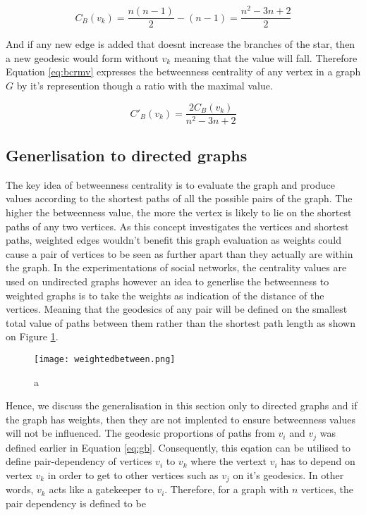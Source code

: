 \begin{equation}
C_B(v_k)= \frac{n(n-1)}{2} - (n-1) = \frac{n^2-3n+2}{2}
\end{equation}

And if any new edge is added that doesnt increase the branches of the star, then a new geodesic would form without $v_k$ meaning that the value will fall. Therefore Equation \ref{eq:bcrmv} expresses the betweenness centrality of any vertex in a graph $G$ by it's represention though a ratio with the maximal value.

\begin{equation}\label{eq:bcrmv}
C'_B(v_k)= \frac{2C_B(v_k)}{n^2-3n+2}
\end{equation}

\subsection{Generlisation to directed graphs}
The key idea of betweenness centrality is to evaluate the graph and produce values according to the shortest paths of all the possible pairs of the graph. The higher the betweenness value, the more the vertex is likely to lie on the shortest paths of any two vertices. As this concept investigates the vertices and shortest paths, weighted edges wouldn't benefit this graph evaluation as weights could cause a pair of vertices to be seen as further apart than they actually are within the graph. In the experimentations of social networks\cite{freeman1979centrality}, the centrality values are used on undirected graphs however an idea to generlise the betweenness to weighted graphs is to take the weights as indication of the distance of the vertices. Meaning that the geodesics of any pair will be defined on the smallest total value of paths between them rather than the shortest path length as shown on Figure \ref{fig:dbc}.

\begin{figure}[!htb]
	\centering
	\texttt{[image: weightedbetween.png]}
	\caption{a}
	\label{fig:dbc}
\end{figure}

Hence, we discuss the generalisation in this section only to directed graphs and if the graph has weights, then they are not implented to ensure betweenness values will not be influenced. The geodesic proportions of paths from $v_i$ and $v_j$ was defined earlier in Equation \ref{eq:gb}. Consequently, this eqation can be utilised to define pair-dependency of vertices $v_i$ to $v_k$ where the vertext $v_i$ has to depend on vertex $v_k$ in order to get to other vertices such as $v_j$ on it's geodesics. In other words, $v_k$ acts like a gatekeeper to $v_i$. Therefore, for a graph with $n$ vertices, the pair dependency is defined to be 

